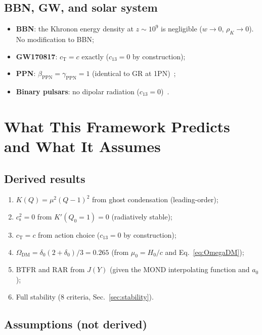 \documentclass[prd,twocolumn,superscriptaddress,longbibliography,floatfix]{revtex4-2}
\newcommand{\cs}{c_{\mathrm{s}}}
\newcommand{\cT}{c_{\mathrm{T}}}
\begin{document}
\subsection{BBN, GW, and solar system}

\begin{itemize}
\item \textbf{BBN}: the Khronon energy density at $z \sim 10^9$
  is negligible ($w \to 0$, $\rho_K \to 0$).  No
  modification to BBN;
\item \textbf{GW170817}: $\cT = c$ exactly
  ($c_{13} = 0$ by construction);
\item \textbf{PPN}: $\beta_{\mathrm{PPN}} = \gamma_{\mathrm{PPN}} = 1$
  (identical to GR at 1PN)~\cite{BS2024,FosterJacobson2006};
\item \textbf{Binary pulsars}: no dipolar radiation
  ($c_{13} = 0$)~\cite{YagiBBY2014}.
\end{itemize}


\section{What This Framework Predicts and What It Assumes}
\label{sec:predictions}

\subsection{Derived results}

\begin{enumerate}
\item[\textsc{D1.}] $K(Q) = \mu^2(Q-1)^2$ from ghost
  condensation (leading-order);
\item[\textsc{D2.}] $\cs^2 = 0$ from $K'(Q_0 = 1) = 0$
  (radiatively stable);
\item[\textsc{D3.}] $\cT = c$ from action choice
  ($c_{13} = 0$ by construction);
\item[\textsc{D4.}] $\Omega_{\mathrm{DM}} = \delta_0(2{+}\delta_0)/3
  = 0.265$ (from $\mu_0 = H_0/c$ and Eq.~\eqref{eq:OmegaDM});
\item[\textsc{D5.}] BTFR and RAR from $J(Y)$ (given the
  MOND interpolating function and $a_0$);
\item[\textsc{D6.}] Full stability (8 criteria,
  Sec.~\ref{sec:stability}).
\end{enumerate}

\subsection{Assumptions (not derived)}
\end{document}

